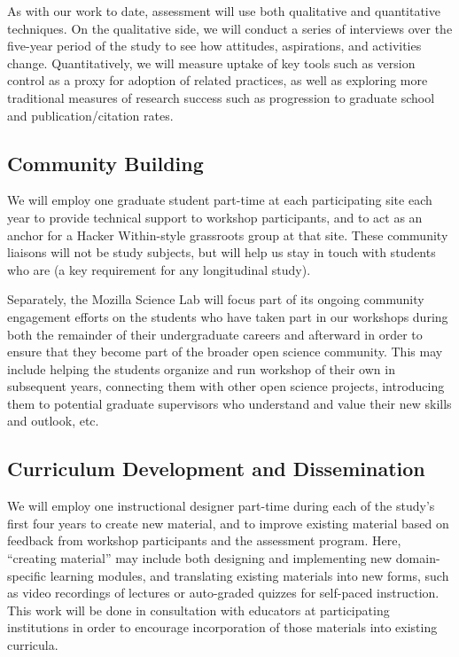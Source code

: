 \documentclass[11pt]{article}
\begin{document}
As with our work to date, assessment will use both qualitative and
quantitative techniques.  On the qualitative side, we will conduct a
series of interviews over the five-year period of the study to see how
attitudes, aspirations, and activities change.  Quantitatively, we
will measure uptake of key tools such as version control as a proxy
for adoption of related practices, as well as exploring more
traditional measures of research success such as progression to
graduate school and publication/citation rates.

\subsection{Community Building}

We will employ one graduate student part-time at each participating
site each year to provide technical support to workshop participants,
and to act as an anchor for a Hacker Within-style grassroots group at
that site.  These community liaisons will not be study subjects, but
will help us stay in touch with students who are (a key requirement
for any longitudinal study).

Separately, the Mozilla Science Lab will focus part of its ongoing
community engagement efforts on the students who have taken part in
our workshops during both the remainder of their undergraduate careers
and afterward in order to ensure that they become part of the broader
open science community.  This may include helping the students
organize and run workshop of their own in subsequent years, connecting
them with other open science projects, introducing them to potential
graduate supervisors who understand and value their new skills and
outlook, etc.

\subsection{Curriculum Development and Dissemination}

We will employ one instructional designer part-time during each of the
study's first four years to create new material, and to improve
existing material based on feedback from workshop participants and the
assessment program.  Here, ``creating material'' may include both
designing and implementing new domain-specific learning modules, and
translating existing materials into new forms, such as video
recordings of lectures or auto-graded quizzes for self-paced
instruction.  This work will be done in consultation with educators at
participating institutions in order to encourage incorporation of
those materials into existing curricula.
\end{document}
